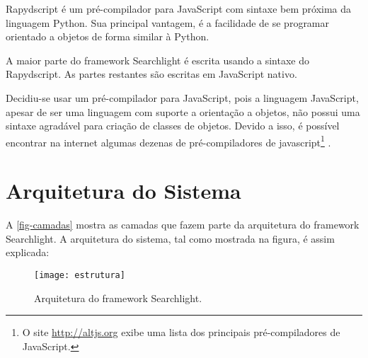 Rapydscript \cite{rapydscript} é um pré-compilador para JavaScript com sintaxe bem próxima da linguagem Python. Sua principal vantagem, é a facilidade de se programar orientado a objetos de forma similar à Python. 

A maior parte do framework Searchlight é escrita usando a sintaxe do Rapydscript. As partes restantes são escritas em JavaScript nativo.

Decidiu-se usar um pré-compilador para JavaScript,  pois a linguagem JavaScript, apesar de ser uma linguagem com suporte a orientação a objetos, não possui uma sintaxe agradável para criação de classes de objetos. Devido a isso, é possível encontrar na internet algumas dezenas de pré-compiladores de javascript\footnote{O site \url{http://altjs.org} exibe uma lista dos principais pré-compiladores de JavaScript.}
. 

\section{Arquitetura do Sistema}
A \autoref{fig-camadas} mostra as camadas que fazem parte da arquitetura do framework Searchlight. A arquitetura do sistema, tal como mostrada na figura, é assim explicada:
	\begin{figure}[htb]
	\caption{\label{fig-camadas}Arquitetura do framework Searchlight.}
	\begin{center}
	    \texttt{[image: estrutura]}
	\end{center}
\end{figure}

